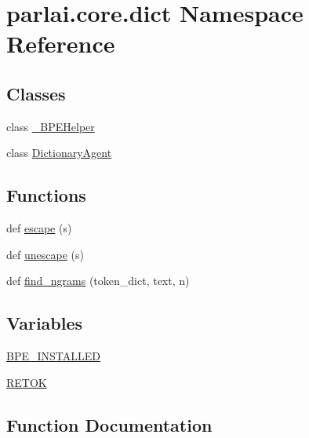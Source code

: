 \hypertarget{namespaceparlai_1_1core_1_1dict}{}\section{parlai.\+core.\+dict Namespace Reference}
\label{namespaceparlai_1_1core_1_1dict}
\subsection*{Classes}
\begin{DoxyCompactItemize}
\item 
class \hyperlink{classparlai_1_1core_1_1dict_1_1__BPEHelper}{\+\_\+\+B\+P\+E\+Helper}
\item 
class \hyperlink{classparlai_1_1core_1_1dict_1_1DictionaryAgent}{Dictionary\+Agent}
\end{DoxyCompactItemize}
\subsection*{Functions}
\begin{DoxyCompactItemize}
\item 
def \hyperlink{namespaceparlai_1_1core_1_1dict_ae44fe4a2be005a4023a758a58f656495}{escape} (s)
\item 
def \hyperlink{namespaceparlai_1_1core_1_1dict_a4d8952ff127b540967c707a58e8ebb48}{unescape} (s)
\item 
def \hyperlink{namespaceparlai_1_1core_1_1dict_a5e9eb43b6c0dce0b3aab7f3ea3717de6}{find\+\_\+ngrams} (token\+\_\+dict, text, n)
\end{DoxyCompactItemize}
\subsection*{Variables}
\begin{DoxyCompactItemize}
\item 
\hyperlink{namespaceparlai_1_1core_1_1dict_a55194215927ea8786279b5089781ce64}{B\+P\+E\+\_\+\+I\+N\+S\+T\+A\+L\+L\+ED}
\item 
\hyperlink{namespaceparlai_1_1core_1_1dict_acc80030514561837c1010293fd1010f4}{R\+E\+T\+OK}
\end{DoxyCompactItemize}


\subsection{Function Documentation}
\mbox{\label{namespaceparlai_1_1core_1_1dict_ae44fe4a2be005a4023a758a58f656495}} 
